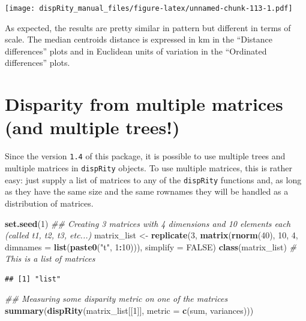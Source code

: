 \documentclass[]{book}
\newenvironment{Shaded}{\begin{snugshade}}{\end{snugshade}}
\newcommand{\CommentTok}[1]{\textcolor[rgb]{0.56,0.35,0.01}{\textit{#1}}}
\newcommand{\DataTypeTok}[1]{\textcolor[rgb]{0.13,0.29,0.53}{#1}}
\newcommand{\DecValTok}[1]{\textcolor[rgb]{0.00,0.00,0.81}{#1}}
\newcommand{\KeywordTok}[1]{\textcolor[rgb]{0.13,0.29,0.53}{\textbf{#1}}}
\newcommand{\NormalTok}[1]{#1}
\newcommand{\OperatorTok}[1]{\textcolor[rgb]{0.81,0.36,0.00}{\textbf{#1}}}
\newcommand{\OtherTok}[1]{\textcolor[rgb]{0.56,0.35,0.01}{#1}}
\newcommand{\StringTok}[1]{\textcolor[rgb]{0.31,0.60,0.02}{#1}}
\begin{document}
\texttt{[image: dispRity\_manual\_files/figure-latex/unnamed-chunk-113-1.pdf]}

As expected, the results are pretty similar in pattern but different in terms of scale.
The median centroids distance is expressed in km in the ``Distance differences'' plots and in Euclidean units of variation in the ``Ordinated differences'' plots.

\hypertarget{multi.input}{%
\section{Disparity from multiple matrices (and multiple trees!)}\label{multi.input}}

Since the version \texttt{1.4} of this package, it is possible to use multiple trees and multiple matrices in \texttt{dispRity} objects.
To use multiple matrices, this is rather easy: just supply a list of matrices to any of the \texttt{dispRity} functions and, as long as they have the same size and the same rownames they will be handled as a distribution of matrices.

\begin{Shaded}
\begin{Highlighting}[]
\KeywordTok{set.seed}\NormalTok{(}\DecValTok{1}\NormalTok{)}
\CommentTok{## Creating 3 matrices with 4 dimensions and 10 elements each (called t1, t2, t3, etc...)}
\NormalTok{matrix_list <-}\StringTok{ }\KeywordTok{replicate}\NormalTok{(}\DecValTok{3}\NormalTok{, }\KeywordTok{matrix}\NormalTok{(}\KeywordTok{rnorm}\NormalTok{(}\DecValTok{40}\NormalTok{), }\DecValTok{10}\NormalTok{, }\DecValTok{4}\NormalTok{, }\DataTypeTok{dimnames =} \KeywordTok{list}\NormalTok{(}\KeywordTok{paste0}\NormalTok{(}\StringTok{"t"}\NormalTok{, }\DecValTok{1}\OperatorTok{:}\DecValTok{10}\NormalTok{))),}
                         \DataTypeTok{simplify =} \OtherTok{FALSE}\NormalTok{)}
\KeywordTok{class}\NormalTok{(matrix_list) }\CommentTok{# This is a list of matrices}
\end{Highlighting}
\end{Shaded}

\begin{verbatim}
## [1] "list"
\end{verbatim}

\begin{Shaded}
\begin{Highlighting}[]
\CommentTok{## Measuring some disparity metric on one of the matrices}
\KeywordTok{summary}\NormalTok{(}\KeywordTok{dispRity}\NormalTok{(matrix_list[[}\DecValTok{1}\NormalTok{]], }\DataTypeTok{metric =} \KeywordTok{c}\NormalTok{(sum, variances)))}
\end{Highlighting}
\end{Shaded}
\end{document}
